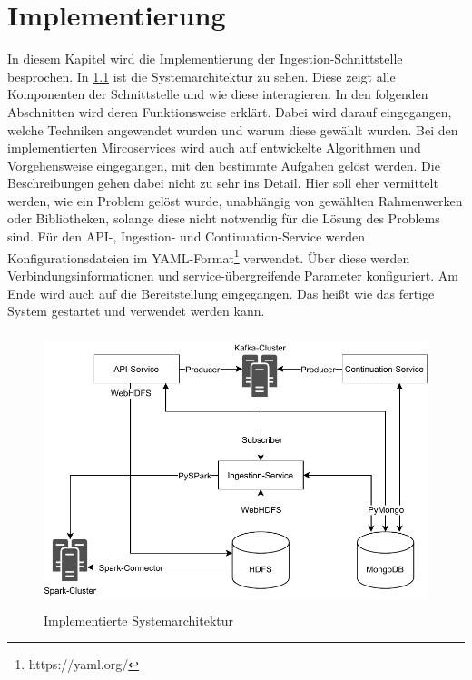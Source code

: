 \chapter{Implementierung}

In diesem Kapitel wird die Implementierung der Ingestion-Schnittstelle besprochen.
In \cref{fig:impl-arch} ist die Systemarchitektur zu sehen.
Diese zeigt alle Komponenten der Schnittstelle und wie diese interagieren.
In den folgenden Abschnitten wird deren Funktionsweise erklärt.
Dabei wird darauf eingegangen, welche Techniken angewendet wurden und warum diese gewählt wurden.
Bei den implementierten Mircoservices wird auch auf entwickelte Algorithmen und Vorgehensweise eingegangen, mit den bestimmte Aufgaben gelöst werden.
Die Beschreibungen gehen dabei nicht zu sehr ins Detail.
Hier soll eher vermittelt werden, wie ein Problem gelöst wurde, unabhängig von gewählten Rahmenwerken oder Bibliotheken, solange diese nicht notwendig für die Lösung des Problems sind.
Für den API-, Ingestion- und Continuation-Service werden Konfigurationsdateien im YAML-Format\footnote{https://yaml.org/} verwendet.
Über diese werden Verbindungsinformationen und service-übergreifende Parameter konfiguriert.
Am Ende wird auch auf die Bereitstellung eingegangen.
Das heißt wie das fertige System gestartet und verwendet werden kann.


\begin{figure}
    \centering
    \includegraphics[height=8cm]{Grafiken/Umsetzung-System-Architektur.pdf}
    \caption{Implementierte Systemarchitektur}
    \label{fig:impl-arch}
\end{figure}








